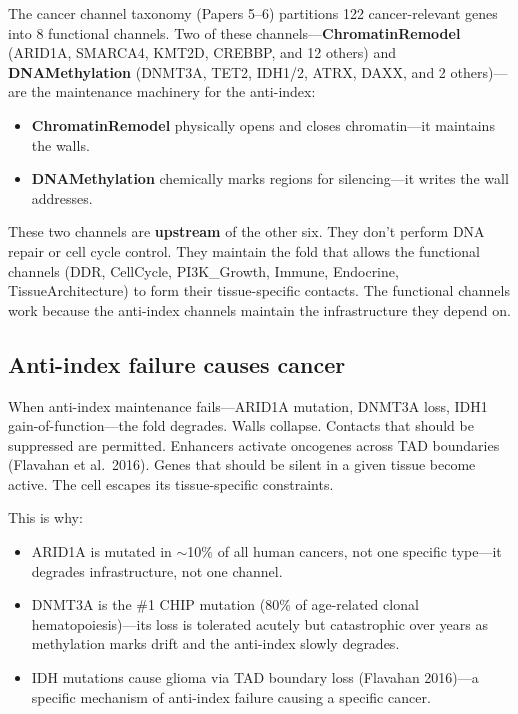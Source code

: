 \documentclass[11pt]{article}
\theoremstyle{definition}
\begin{document}
The cancer channel taxonomy (Papers 5--6) partitions 122 cancer-relevant genes into 8 functional channels. Two of these channels---\textbf{ChromatinRemodel} (ARID1A, SMARCA4, KMT2D, CREBBP, and 12 others) and \textbf{DNAMethylation} (DNMT3A, TET2, IDH1/2, ATRX, DAXX, and 2 others)---are the maintenance machinery for the anti-index:

\begin{itemize}[nosep]
\item \textbf{ChromatinRemodel} physically opens and closes chromatin---it maintains the walls.
\item \textbf{DNAMethylation} chemically marks regions for silencing---it writes the wall addresses.
\end{itemize}

These two channels are \textbf{upstream} of the other six. They don't perform DNA repair or cell cycle control. They maintain the fold that allows the functional channels (DDR, CellCycle, PI3K\_Growth, Immune, Endocrine, TissueArchitecture) to form their tissue-specific contacts. The functional channels work because the anti-index channels maintain the infrastructure they depend on.

\subsection{Anti-index failure causes cancer}

When anti-index maintenance fails---ARID1A mutation, DNMT3A loss, IDH1 gain-of-function---the fold degrades. Walls collapse. Contacts that should be suppressed are permitted. Enhancers activate oncogenes across TAD boundaries (Flavahan et al.\ 2016). Genes that should be silent in a given tissue become active. The cell escapes its tissue-specific constraints.

This is why:
\begin{itemize}[nosep]
\item ARID1A is mutated in $\sim$10\% of all human cancers, not one specific type---it degrades infrastructure, not one channel.
\item DNMT3A is the \#1 CHIP mutation (80\% of age-related clonal hematopoiesis)---its loss is tolerated acutely but catastrophic over years as methylation marks drift and the anti-index slowly degrades.
\item IDH mutations cause glioma via TAD boundary loss (Flavahan 2016)---a specific mechanism of anti-index failure causing a specific cancer.
\end{itemize}
\end{document}
